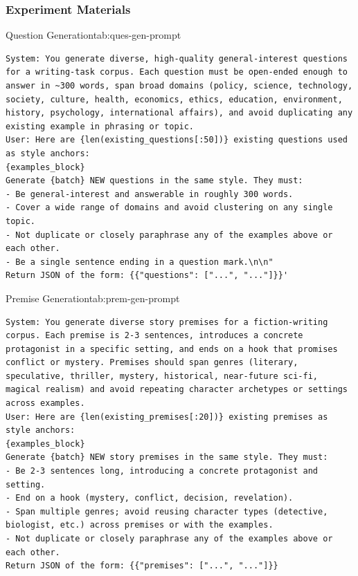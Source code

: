 \subsubsection{Experiment Materials}

\begin{prompttable}{Question Generation}{tab:ques-gen-prompt}
\begin{lstlisting}[style=promptstyle]
System: You generate diverse, high-quality general-interest questions for a writing-task corpus. Each question must be open-ended enough to answer in ~300 words, span broad domains (policy, science, technology, society, culture, health, economics, ethics, education, environment, history, psychology, international affairs), and avoid duplicating any existing example in phrasing or topic.
User: Here are {len(existing_questions[:50])} existing questions used as style anchors:
{examples_block}
Generate {batch} NEW questions in the same style. They must:
- Be general-interest and answerable in roughly 300 words.
- Cover a wide range of domains and avoid clustering on any single topic.
- Not duplicate or closely paraphrase any of the examples above or each other.
- Be a single sentence ending in a question mark.\n\n"
Return JSON of the form: {{"questions": ["...", "..."]}}'
\end{lstlisting}
\end{prompttable}

\begin{prompttable}{Premise Generation}{tab:prem-gen-prompt}
\begin{lstlisting}[style=promptstyle]
System: You generate diverse story premises for a fiction-writing corpus. Each premise is 2-3 sentences, introduces a concrete protagonist in a specific setting, and ends on a hook that promises conflict or mystery. Premises should span genres (literary, speculative, thriller, mystery, historical, near-future sci-fi, magical realism) and avoid repeating character archetypes or settings across examples.
User: Here are {len(existing_premises[:20])} existing premises as style anchors:
{examples_block}
Generate {batch} NEW story premises in the same style. They must:
- Be 2-3 sentences long, introducing a concrete protagonist and setting.
- End on a hook (mystery, conflict, decision, revelation).
- Span multiple genres; avoid reusing character types (detective, biologist, etc.) across premises or with the examples.
- Not duplicate or closely paraphrase any of the examples above or each other.
Return JSON of the form: {{"premises": ["...", "..."]}}
\end{lstlisting}
\end{prompttable}

